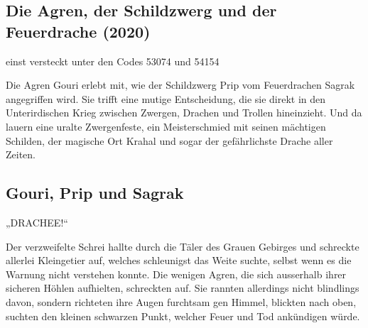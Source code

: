 \begin{chapterbox}
    \chapter{Die Agren, der Schildzwerg und der Feuerdrache (2020)}
    \label{2020-die-agren-der-schildzwerg-und-der-feuerdrache}

    \begin{center}
        einst versteckt unter den Codes 53074 und 54154
    \end{center}
    
    Die Agren Gouri erlebt mit, wie der Schildzwerg Prip vom Feuerdrachen Sagrak angegriffen wird. Sie trifft eine mutige Entscheidung, die sie direkt in den Unterirdischen Krieg zwischen Zwergen, Drachen und Trollen hineinzieht. Und da lauern eine uralte Zwergenfeste, ein Meisterschmied mit seinen mächtigen Schilden, der magische Ort Krahal und sogar der gefährlichste Drache aller Zeiten.



\end{chapterbox}







\newpage
\section{Gouri, Prip und Sagrak}


„DRACHEE!“

Der verzweifelte Schrei hallte durch die Täler des Grauen Gebirges und schreckte allerlei Kleingetier auf, welches schleunigst das Weite suchte, selbst wenn es die Warnung nicht verstehen konnte. Die wenigen Agren, die sich ausserhalb ihrer sicheren Höhlen aufhielten, schreckten auf. Sie rannten allerdings nicht blindlings davon, sondern richteten ihre Augen furchtsam gen Himmel, blickten nach oben, suchten den kleinen schwarzen Punkt, welcher Feuer und Tod ankündigen würde.

